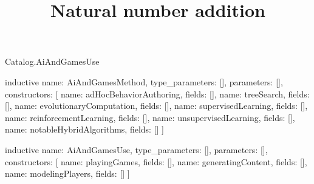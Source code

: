 \begin{lexlean}{Catalog.AiAndGamesUse}
\title{Natural number addition}
\begin{semanticmodule}
inductive{
  name: AiAndGamesMethod,
  type_parameters: [],
  parameters: [],
  constructors: [
    {name: adHocBehaviorAuthoring, fields: []},
    {name: treeSearch, fields: []},
    {name: evolutionaryComputation, fields: []},
    {name: supervisedLearning, fields: []},
    {name: reinforcementLearning, fields: []},
    {name: unsupervisedLearning, fields: []},
    {name: notableHybridAlgorithms, fields: []}
  ]
}

inductive{
  name: AiAndGamesUse,
  type_parameters: [],
  parameters: [],
  constructors: [
    {name: playingGames, fields: []},
    {name: generatingContent, fields: []},
    {name: modelingPlayers, fields: []}
  ]
}
\end{semanticmodule}
\end{lexlean}
